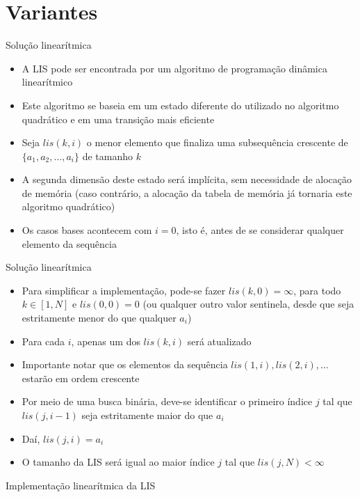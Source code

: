 \section{Variantes}

\begin{frame}[fragile]{Solução linearítmica}

    \begin{itemize}
        \item A LIS pode ser encontrada por um algoritmo de programação dinâmica linearítmico

        \item Este algoritmo se baseia em um estado diferente do utilizado no algoritmo
            quadrático e em uma transição mais eficiente

        \item Seja $lis(k, i)$ o menor elemento que finaliza uma subsequência crescente de
            $\{ a_1, a_2, \ldots, a_i \}$ de tamanho $k$

        \item A segunda dimensão deste estado será implícita, sem necessidade de alocação de
            memória (caso contrário, a alocação da tabela de memória já tornaria este 
            algoritmo quadrático)

        \item Os casos bases acontecem com $i = 0$, isto é, antes de se considerar qualquer
            elemento da sequência

    \end{itemize}

\end{frame}

\begin{frame}[fragile]{Solução linearítmica}

    \begin{itemize}
        \item Para simplificar a implementação, pode-se fazer $lis(k, 0) = \infty$, para 
            todo $k\in [1, N]$ e $lis(0, 0) = 0$ (ou qualquer outro valor sentinela, desde
            que seja estritamente menor do que qualquer $a_i$)

        \item Para cada $i$, apenas um dos $lis(k, i)$ será atualizado

        \item Importante notar que os elementos da sequência $lis(1, i), lis(2, i), \ldots$
            estarão em ordem crescente

        \item Por meio de uma busca binária, deve-se identificar o primeiro índice $j$ tal que
            $lis(j, i - 1)$ seja estritamente maior do que $a_i$

        \item Daí, $lis(j, i) = a_i$

        \item O tamanho da LIS será igual ao maior índice $j$ tal que $lis(j, N) < \infty$
    \end{itemize}

\end{frame}



\begin{frame}[fragile]{Implementação linearítmica da LIS}
\end{frame}
